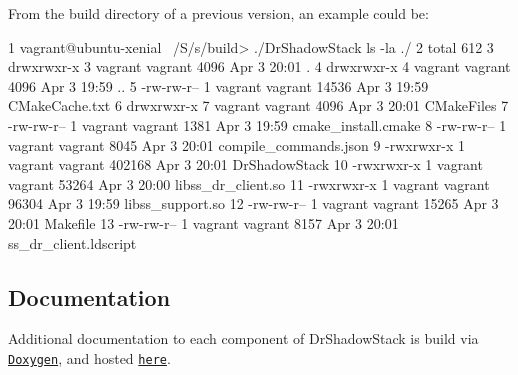 From the build directory of a previous version, an example could be\+: 
\begin{DoxyCode}
1 vagrant@ubuntu-xenial ~/S/s/build> ./DrShadowStack ls -la ./
2 total 612
3 drwxrwxr-x 3 vagrant vagrant   4096 Apr  3 20:01 .
4 drwxrwxr-x 4 vagrant vagrant   4096 Apr  3 19:59 ..
5 -rw-rw-r-- 1 vagrant vagrant  14536 Apr  3 19:59 CMakeCache.txt
6 drwxrwxr-x 7 vagrant vagrant   4096 Apr  3 20:01 CMakeFiles
7 -rw-rw-r-- 1 vagrant vagrant   1381 Apr  3 19:59 cmake\_install.cmake
8 -rw-rw-r-- 1 vagrant vagrant   8045 Apr  3 20:01 compile\_commands.json
9 -rwxrwxr-x 1 vagrant vagrant 402168 Apr  3 20:01 DrShadowStack
10 -rwxrwxr-x 1 vagrant vagrant  53264 Apr  3 20:00 libss\_dr\_client.so
11 -rwxrwxr-x 1 vagrant vagrant  96304 Apr  3 19:59 libss\_support.so
12 -rw-rw-r-- 1 vagrant vagrant  15265 Apr  3 20:01 Makefile
13 -rw-rw-r-- 1 vagrant vagrant   8157 Apr  3 20:01 ss\_dr\_client.ldscript
\end{DoxyCode}


\subsection*{Documentation}

Additional documentation to each component of Dr\+Shadow\+Stack is build via \href{http://www.stack.nl/~dimitri/doxygen/}{\tt Doxygen}, and hosted \href{https://zwimer.com/DrShadowStack}{\tt here}. 